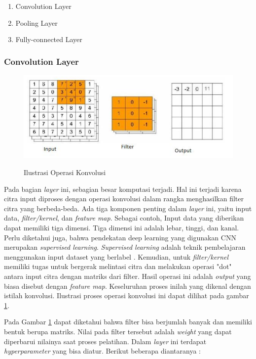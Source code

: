 \begin{enumerate}[nolistsep]
  \item Convolution Layer
  \item Pooling Layer
  \item Fully-connected Layer
\end{enumerate}

\subsubsection{Convolution Layer}

\begin{figure} [ht] \centering  
  \includegraphics[scale=1]{gambar/convolution-operation.png}
  \caption{Ilustrasi Operasi Konvolusi}
  \label{fig:Ilustrasi Operasi Konvolusi}
  \parencite{MaxPoolingLayer}
\end{figure}

Pada bagian \emph{layer} ini, sebagian besar komputasi terjadi. Hal ini terjadi karena citra input diproses dengan operasi konvolusi dalam rangka menghasilkan filter citra yang berbeda-beda. Ada tiga komponen penting dalam \emph{layer} ini, yaitu input data, \emph{filter/kernel}, dan \emph{feature map}. Sebagai contoh, Input data yang diberikan dapat memiliki tiga dimensi. Tiga dimensi ini adalah lebar, tinggi, dan kanal. Perlu diketahui juga, bahwa pendekatan deep learning yang digunakan CNN merupakan \emph{supervised learning}. \emph{Supervised learning} adalah teknik pembelajaran menggunakan input dataset yang berlabel \parencite{MdZahangir}. Kemudian, untuk \emph{filter/kernel} memiliki tugas untuk bergerak melintasi citra dan melakukan operasi "dot" antara input citra dengan matriks dari filter. Hasil operasi ini adalah \emph{output} yang biasa disebut dengan \emph{feature map}. Keseluruhan proses inilah yang dikenal dengan istilah konvolusi. Ilustrasi proses operasi konvolusi ini dapat dilihat pada gambar \ref{fig:Ilustrasi Operasi Konvolusi}.


Pada Gambar \ref{fig:Ilustrasi Operasi Konvolusi} dapat diketahui bahwa filter bisa berjumlah banyak dan memiliki bentuk berupa matriks. Nilai pada filter tersebut adalah \emph{weight} yang dapat diperbarui nilainya saat proses pelatihan. Dalam \emph{layer} ini terdapat \emph{hyperparameter} yang bisa diatur. Berikut beberapa diantaranya :


